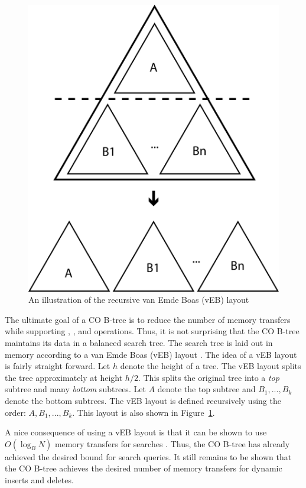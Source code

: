 \documentclass[preprint]{style}
\begin{document}
\begin{figure}

\begin{center}
	\includegraphics[width=0.75\columnwidth]{figures/veb.pdf}
\end{center}

\caption{An illustration of the recursive van Emde Boas (vEB) layout}
\label{fig:veb}
\end{figure}

The ultimate goal of a CO B-tree is to reduce the number of memory transfers
while supporting \Search{}, \Insert{}, and \Delete{} operations. Thus, it is
not surprising that the CO B-tree maintains its data in a balanced search tree.
The search tree is laid out in memory according to a van Emde Boas (vEB) layout
\cite{veb1,veb2}. The idea of a vEB layout is fairly straight forward. Let $h$
denote the height of a tree. The vEB layout splits the tree approximately at
height $h/2$. This splits the original tree into a \textit{top} subtree and
many \textit{bottom} subtrees.  Let $A$ denote the top subtree and
$B_1,...,B_k$ denote the bottom subtrees.  The vEB layout is defined
recursively using the order: $A,B_1,...,B_k$. This layout is also shown in
Figure~\ref{fig:veb}.

A nice consequence of using a vEB layout is that it can be shown to use
$O(\log_{B}{N})$ memory transfers for searches \cite{veb1, veb2}. Thus, the CO
B-tree has already achieved the desired bound for search queries. It still
remains to be shown that the CO B-tree achieves the desired number of memory
transfers for dynamic inserts and deletes.
\end{document}
